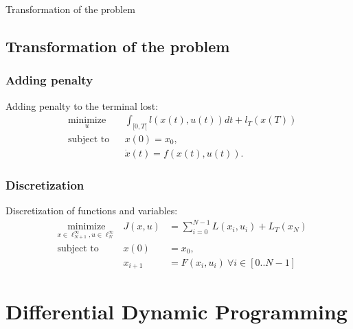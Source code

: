 \documentclass{beamer}
\begin{document}
  \begin{frame}{Transformation of the problem}
  \subsection{Transformation of the problem}
 \subsubsection{Adding penalty}
Adding penalty to the terminal lost:
\begin{equation}
\begin{aligned}
& \underset{u}{\text{minimize}}
& & \int_{[0,T[} l(x(t),u(t)) dt + l_T(x(T)) \\
& \text{subject to}
& & x(0) = x_0,  \\
&&& \dot{x} (t) = f(x(t), u(t)).
\end{aligned}
\end{equation}

\subsubsection{Discretization}
Discretization of functions and variables:
\begin{equation}
\label{eq}
\begin{aligned}
&\underset{x \in \ell_{N+1}^\infty, u \in \ell_{N}^\infty}{\text{minimize}}          &J(x, u) &=\sum_{i = 0}^{N-1} L(x_i, u_i) + L_T(x_N) \\
&\text{subject to}       &x(0)      &= x_0,  \\ %
&							      &x_{i+1}  &= F(x_i, u_i) \ \forall i \in [0 .. N-1]
\end{aligned}
\end{equation}
  \end{frame}
  
\section{Differential Dynamic Programming}
\end{document}
